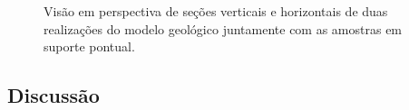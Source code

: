 \begin{figure}[H]
	\caption{\label{cobre_reals} Visão em perspectiva de seções verticais e horizontais de duas realizações do modelo geológico juntamente com as amostras em suporte pontual.}
	\centering
     \hspace{1em}
\end{figure}

\subsection{Discussão}

